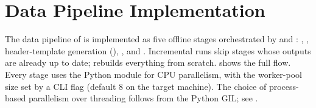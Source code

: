\section{Data Pipeline Implementation}
\label{sec:impl-data}

The data pipeline of  is implemented as five
offline stages orchestrated by  and :
, , header-template generation
(), , and .
Incremental runs skip stages whose outputs are already up to date;
 rebuilds everything from scratch.
 shows the full flow.
Every stage uses the Python  module for CPU
parallelism, with the worker-pool size set by a CLI flag (default 8 on
the target machine).
The choice of process-based parallelism over threading follows from the
Python GIL; see .

